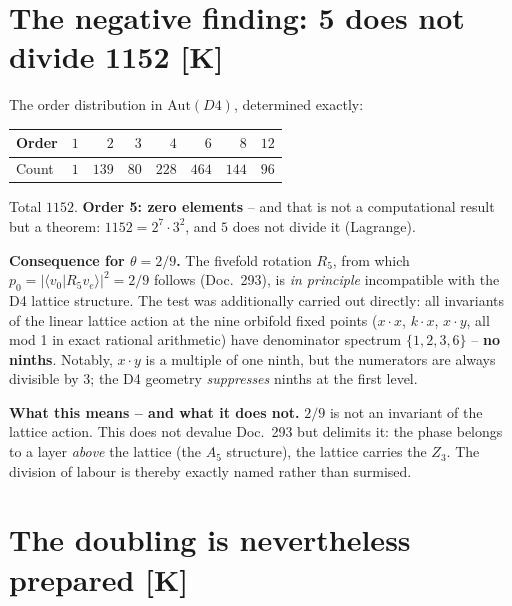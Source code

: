 \documentclass[11pt]{report}
\begin{document}
\chapter{The negative finding: 5 does not divide 1152 [K]}

The order distribution in $\text{Aut}(D4)$, determined exactly:

\begin{center}
\begin{tabular}{lrrrrrrr}
\toprule
Order & $1$ & $2$ & $3$ & $4$ & $6$ & $8$ & $12$ \\
\midrule
Count & $1$ & $139$ & $80$ & $228$ & $464$ & $144$ & $96$ \\
\bottomrule
\end{tabular}
\end{center}

Total $1152$. \textbf{Order 5: zero elements} -- and that is not a
computational result but a theorem: $1152 = 2^7\cdot3^2$, and $5$
does not divide it (Lagrange).

\textbf{Consequence for $\theta = 2/9$.} The fivefold rotation
$R_5$, from which $p_0 = |\langle v_0|R_5 v_e\rangle|^2 = 2/9$
follows (Doc.~293), is \emph{in principle} incompatible with the D4
lattice structure. The test was additionally carried out directly:
all invariants of the linear lattice action at the nine orbifold
fixed points ($x\!\cdot\!x$, $k\!\cdot\!x$, $x\!\cdot\!y$, all mod 1
in exact rational arithmetic) have denominator spectrum
$\{1,2,3,6\}$ -- \textbf{no ninths}. Notably, $x\!\cdot\!y$ is a
multiple of one ninth, but the numerators are always divisible by 3;
the D4 geometry \emph{suppresses} ninths at the first level.

\textbf{What this means -- and what it does not.} $2/9$ is not an
invariant of the lattice action. This does not devalue Doc.~293 but
delimits it: the phase belongs to a layer \emph{above} the lattice
(the $A_5$ structure), the lattice carries the $Z_3$. The division
of labour is thereby exactly named rather than surmised.

\chapter{The doubling is nevertheless prepared [K]}
\end{document}
